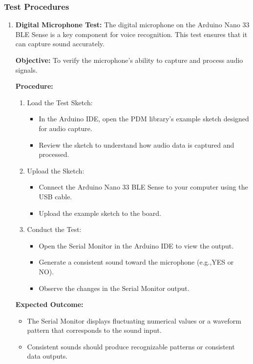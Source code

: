 \subsubsection{Test Procedures}

\begin{enumerate}
	\item \textbf{Digital Microphone Test:}
	The digital microphone on the Arduino Nano 33 BLE Sense is a key component for voice recognition. This test ensures that it can capture sound accurately.

	\textbf{Objective:} To verify the microphone's ability to capture and process audio signals.
	
	\textbf{Procedure:}
	\begin{enumerate}
		\item Load the Test Sketch:
		\begin{itemize}
			\item In the Arduino IDE, open the PDM library's example sketch designed for audio capture.
			\item Review the sketch to understand how audio data is captured and processed.
		\end{itemize}
		\item Upload the Sketch:
		\begin{itemize}
			\item Connect the Arduino Nano 33 BLE Sense to your computer using the USB cable.
			\item Upload the example sketch to the board.
		\end{itemize}
		\item Conduct the Test:
		\begin{itemize}
			\item Open the Serial Monitor in the Arduino IDE to view the output.
			\item Generate a consistent sound toward the microphone (e.g.,YES or NO).
			\item Observe the changes in the Serial Monitor output.
		\end{itemize}	
		
	
\end{enumerate}

\bigskip

\textbf{Expected Outcome:}
\begin{itemize}
	\item The Serial Monitor displays fluctuating numerical values or a waveform pattern that corresponds to the sound input.
	\item Consistent sounds should produce recognizable patterns or consistent data outputs.
\end{itemize}


\end{enumerate}
